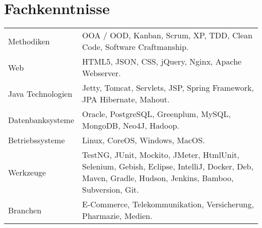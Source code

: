 \section*{Fachkenntnisse}
\begin{longtable}{@{}p{6cm}p{10cm}}
Methodiken	        & OOA / OOD, Kanban, Scrum, XP, TDD, Clean Code, Software Craftmanship.\\
Web         	    & HTML5, JSON, CSS, jQuery, Nginx, Apache Webserver.\\
Java Technologien	& Jetty, Tomcat, Servlets, JSP, Spring Framework, JPA Hibernate, Mahout.\\
Datenbanksysteme	& Oracle, PostgreSQL, Greenplum, MySQL, MongoDB, Neo4J, Hadoop.\\
Betriebssysteme	    & Linux, CoreOS, Windows, MacOS.\\
Werkzeuge		    & TestNG, JUnit, Mockito, JMeter, HtmlUnit, Selenium, Gebish, Eclipse, IntelliJ, Docker, Deb, Maven, Gradle, Hudson, Jenkins, Bamboo, Subversion, Git.\\
Branchen		    & E-Commerce, Telekommunikation, Versicherung, Pharmazie, Medien.\\
\end{longtable}

